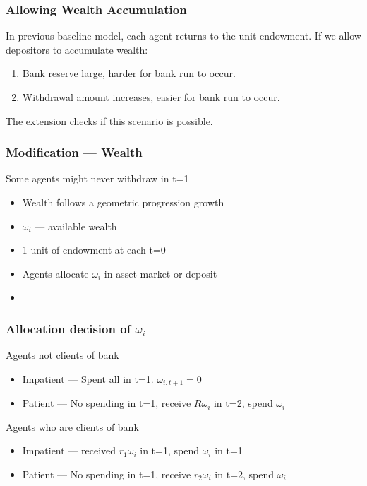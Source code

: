 \begin{frame}
    \frametitle{Allowing Wealth Accumulation}

    In previous baseline model, each agent returns to the unit endowment.
    \pause
    \vfill 
    If we allow depositors to accumulate wealth: 
    \begin{enumerate}
        \item Bank reserve large, harder for bank run to occur.
        \item Withdrawal amount increases, easier for bank run to occur.
    \end{enumerate}

    The extension checks if this scenario is possible.

\end{frame}

\begin{frame}
    \frametitle{Modification --- Wealth}

    Some agents might never withdraw in t=1
    \begin{itemize}
        \item Wealth follows a geometric progression growth 
    \end{itemize}
    \vfill 
    \begin{itemize}
        \item $\omega_i$ --- available wealth 
        \item 1 unit of endowment at each t=0 
        \item Agents allocate $\omega_i$ in asset market or deposit
        \item \color{red}{Spends $\omega_i$ each cycle --- (Sort of) Hand to mouth setting}
    \end{itemize}
\end{frame}

\begin{frame}
    \frametitle{Allocation decision of $\omega_i$}

    Agents not clients of bank 
    \begin{itemize}
        \item Impatient --- Spent all in t=1. $\omega_{i, t+1}=0$
        \item Patient --- No spending in t=1, receive $R\omega_i$ in t=2, spend $\omega_i$
    \end{itemize}

    Agents who are clients of bank
    \begin{itemize}
        \item Impatient --- received $r_1 \omega_i$ in t=1, spend $\omega_i$ in t=1
        \item Patient --- No spending in t=1, receive $r_2 \omega_i$ in t=2, spend $\omega_i$
    \end{itemize}
\end{frame}

